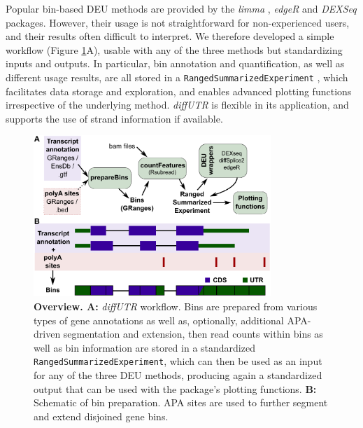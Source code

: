 \documentclass{bmcart}
\begin{document}
Popular bin-based DEU methods are provided by the \textit{limma} \cite{Ritchie2015LimmaStudies, Law2014Voom:Counts}, \textit{edgeR} \cite{Robinson2009EdgeR:Data} and \textit{DEXSeq} \cite{Anders2012DetectingData} packages. However, their usage is not straightforward for non-experienced users, and their results often difficult to interpret. We therefore developed a simple workflow (Figure \ref{fig:scheme}A), usable with any of the three methods but standardizing inputs and outputs. In particular, bin annotation and quantification, as well as different usage results, are all stored in a \texttt{RangedSummarizedExperiment} \cite{Morgan2018SummarizedExperiment:Container}, which facilitates data storage and exploration, and enables advanced plotting functions irrespective of the underlying method. \textit{diffUTR} is flexible in its application, and supports the use of strand information if available.

\begin{figure}[h]
\includegraphics[width=0.8\textwidth]{figure1.pdf}
\caption{\textbf{Overview. A:} \textit{diffUTR} workflow. Bins are prepared from various types of gene annotations as well as, optionally, additional APA-driven segmentation and extension, then read counts within bins as well as bin information are stored in a standardized \texttt{RangedSummarizedExperiment}, which can then be used as an input for any of the three DEU methods, producing again a standardized output that can be used with the package's plotting functions. \textbf{B:} Schematic of bin preparation. APA sites are used to further segment and extend disjoined gene bins.}
\label{fig:scheme}
\end{figure}
\end{document}
